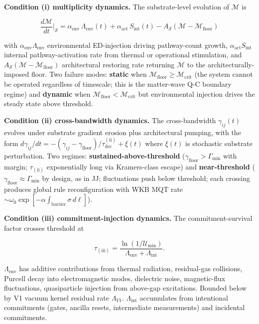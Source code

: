 \documentclass[11pt]{book}
\begin{document}
\textbf{Condition (i) multiplicity dynamics.} The substrate-level evolution of $\mathcal{M}$ is

\[
\frac{d\mathcal{M}}{dt}\bigg|_\mathcal{S} = \alpha_\mathrm{env}\,\Lambda_\mathrm{env}(t) + \alpha_\mathrm{act}\,S_\mathrm{int}(t) - A_\mathcal{S}(\mathcal{M} - \mathcal{M}_\mathrm{floor})
\]

with $\alpha_\mathrm{env}\Lambda_\mathrm{env}$ environmental ED-injection driving pathway-count growth, $\alpha_\mathrm{act}S_\mathrm{int}$ internal pathway-activation rate from thermal or operational stimulation, and $A_\mathcal{S}(\mathcal{M} - \mathcal{M}_\mathrm{floor})$ architectural restoring rate returning $\mathcal{M}$ to the architecturally-imposed floor. Two failure modes: \textbf{static} when $\mathcal{M}_\mathrm{floor} \geq \mathcal{M}_\mathrm{crit}$ (the system cannot be operated regardless of timescale; this is the matter-wave Q-C boundary regime) and \textbf{dynamic} when $\mathcal{M}_\mathrm{floor} < \mathcal{M}_\mathrm{crit}$ but environmental injection drives the steady state above threshold.

\textbf{Condition (ii) cross-bandwidth dynamics.} The cross-bandwidth $\gamma_{ij}(t)$ evolves under substrate gradient erosion plus architectural pumping, with the form $d\gamma_{ij}/dt = -(\gamma_{ij} - \gamma_\mathrm{floor})/\tau_\mathrm{dec}^{(\mathrm{ii})} + \xi(t)$ where $\xi(t)$ is stochastic substrate perturbation. Two regimes: \textbf{sustained-above-threshold} ($\gamma_\mathrm{floor} > \Gamma_\mathrm{min}$ with margin; $\tau_{(\mathrm{ii})}$ exponentially long via Kramers-class escape) and \textbf{near-threshold} ($\gamma_\mathrm{floor} \approx \Gamma_\mathrm{min}$ by design, as in JJ; fluctuations push below threshold; each crossing produces global rule reconfiguration with WKB MQT rate $\sim \omega_0 \exp[-\alpha\int_\mathrm{barrier}\sigma\,d\ell]$).

\textbf{Condition (iii) commitment-injection dynamics.} The commitment-survival factor crosses threshold at

\[
\tau_{(\mathrm{iii})} = \frac{\ln(1/\mathcal{U}_\mathrm{min})}{\Lambda_\mathrm{env} + \Lambda_\mathrm{int}}.
\]

$\Lambda_\mathrm{env}$ has additive contributions from thermal radiation, residual-gas collisions, Purcell decay into electromagnetic modes, dielectric noise, magnetic-flux fluctuations, quasiparticle injection from above-gap excitations. Bounded below by V1 vacuum kernel residual rate $\Lambda_{V1}$. $\Lambda_\mathrm{int}$ accumulates from intentional commitments (gates, ancilla resets, intermediate measurements) and incidental commitments.
\end{document}
